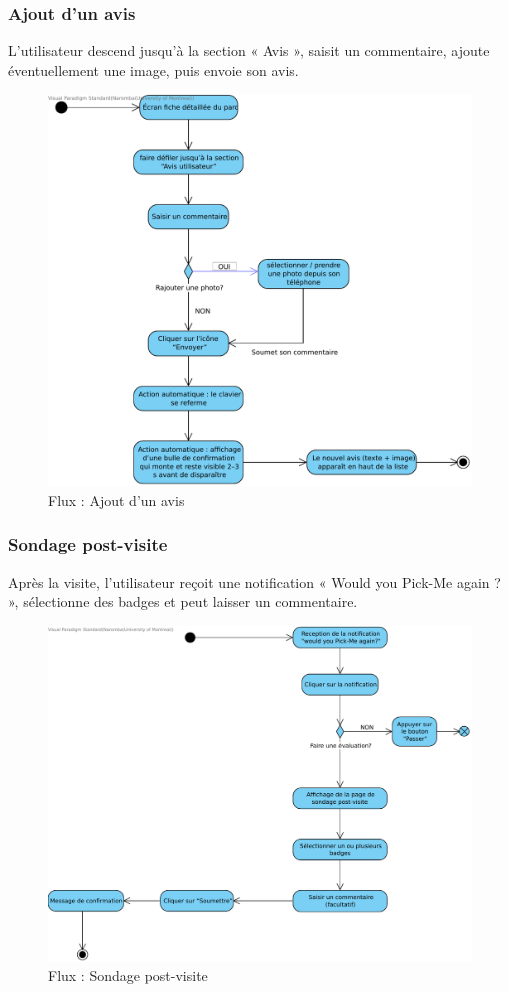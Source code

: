 \documentclass[12pt,a4paper]{article}
\begin{document}
\subsubsection{Ajout d'un avis}

L'utilisateur descend jusqu'à la section « Avis », saisit un commentaire, ajoute éventuellement une image, puis envoie son avis.

\begin{figure}[H]
  \centering
  \includegraphics[width=0.9\linewidth]{attachments/Ajouter_un_avis_spot.pdf}
  \caption{Flux : Ajout d'un avis}
\end{figure}

\subsubsection{Sondage post-visite}

Après la visite, l'utilisateur reçoit une notification « Would you Pick-Me again ? », sélectionne des badges et peut laisser un commentaire.

\begin{figure}[H]
  \centering
  \includegraphics[width=0.9\linewidth]{attachments/Sondage_post_visite.pdf}
  \caption{Flux : Sondage post-visite}
\end{figure}
\end{document}
